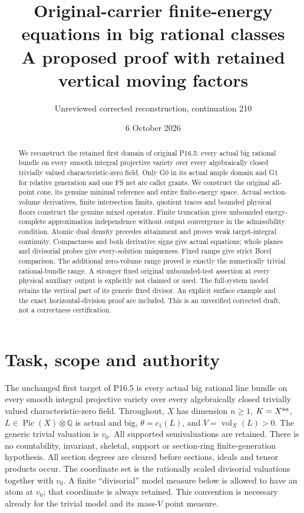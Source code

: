 \documentclass[10pt]{article}
\title{Original-carrier finite-energy equations in big rational classes\\
\large A proposed proof with retained vertical moving factors}
\author{Unreviewed corrected reconstruction, continuation 210}
\date{6 October 2026}
\newcommand{\vol}{\operatorname{vol}}
\begin{document}
\maketitle
\begin{abstract}
We reconstruct the retained first domain of original P16.5: every actual
big rational bundle on every smooth integral projective variety over every
algebraically closed trivially valued characteristic-zero field. Only G0 in
its actual ample domain and G1 for relative generation and one FS net are
caller grants. We construct the original all-point cone, its genuine minimal
reference and entire finite-energy space. Actual section-volume derivatives,
finite intersection limits, quotient traces and bounded physical floors
construct the genuine mixed operator. Finite truncation gives unbounded
energy-complete approximation independence without output convergence in
the admissibility condition. Atomic dual density precedes attainment and
proves weak target-integral continuity. Compactness and both derivative
signs give actual equations; whole planes and divisorial probes give
every-solution uniqueness. Fixed ramps give strict Borel comparison.
The additional zero-volume range proved is exactly the numerically trivial
rational-bundle range. A stronger fixed original unbounded-test assertion
at every physical auxiliary output is explicitly not claimed or used.
The full-system model retains the vertical part of its generic fixed divisor.
An explicit surface example and the exact horizontal-division proof are
included. This is an unverified corrected draft, not a correctness certification.
\end{abstract}

\section{Task, scope and authority}
The unchanged first target of P16.5 is every actual big rational line bundle
on every smooth integral projective variety over every algebraically closed
trivially valued characteristic-zero field. Throughout, $X$ has dimension
$n\geq1$, $K=X^{\rm an}$, $L\in\operatorname{Pic}(X)\otimes\mathbb Q$
is actual and big, $\theta=c_1(L)$, and $V=\vol_X(L)>0$.
The generic trivial valuation is $v_0$. All supported semivaluations are
retained. There is no countability, invariant, skeletal, support or
section-ring finite-generation hypothesis. All section degrees are cleared
before sections, ideals and tensor products occur.
The coordinate set is the rationally scaled divisorial valuations together
with $v_0$. A finite ``divisorial'' model measure below is allowed to have
an atom at $v_0$; that coordinate is always retained. This convention is
necessary already for the trivial model and its mass-$V$ point measure.
\end{document}
